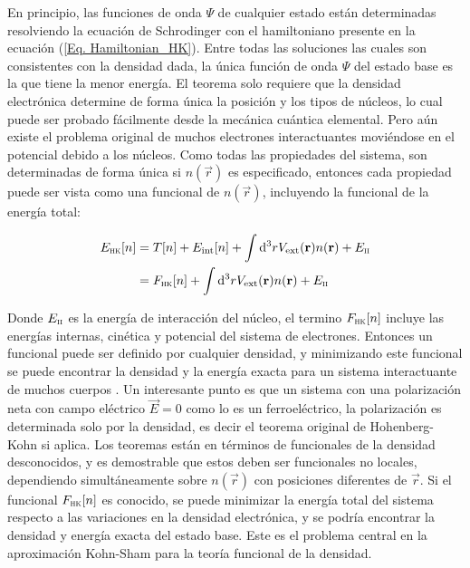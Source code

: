 
En principio, las funciones de onda $\Psi$ de cualquier estado están determinadas resolviendo la ecuación de Schrodinger con el hamiltoniano presente en la ecuación (\ref{Eq. Hamiltonian_HK}).  Entre todas las soluciones las cuales son consistentes con la densidad dada, la única función de onda $\Psi$ del estado base es la que tiene la menor energía. El teorema solo requiere que la densidad electrónica determine de forma única la posición y los tipos de núcleos, lo cual puede ser probado fácilmente desde la mecánica cuántica elemental. Pero aún existe el problema original de muchos electrones interactuantes moviéndose en el potencial debido a los núcleos. Como todas las propiedades del sistema, son determinadas de forma única si $n(\vec{r})$ es especificado, entonces cada propiedad puede ser vista como una funcional de $n(\vec{r})$, incluyendo la funcional de la energía total:

\begin{equation}
    \begin{split}
        E_{\textsc{hk}}[n]&=T[n]+E_{\text{int}}[n]+\int\mathrm{d}^{3}rV_{\text{ext}}(\vec{r})n(\vec{r})+E_{\textsc{ii}}\\
        &=F_{\textsc{hk}}[n]+\int\mathrm{d}^{3}rV_{\text{ext}}(\vec{r})n(\vec{r})+E_{\textsc{ii}}
    \end{split}
    \label{Eq. E_HK}
\end{equation}

Donde $E_{\textsc{ii}}$ es la energía de interacción del núcleo, el termino $F_{\textsc{hk}}[n]$ incluye  las energías internas, cinética y potencial del sistema de electrones. Entonces un funcional puede ser definido por cualquier densidad, y minimizando este funcional se puede encontrar la densidad y la energía exacta para un sistema interactuante de muchos cuerpos \cite{martin_2004}. Un interesante punto es que un sistema con una polarización neta con campo eléctrico $\vec{E}=0$ como lo es un ferroeléctrico, la polarización es determinada solo por la densidad\cite{Martin1997FunctionalSystems,Martin1997RecentSolids}, es decir el teorema original de Hohenberg-Kohn si aplica. Los teoremas están en términos de funcionales de la densidad desconocidos, y es demostrable que estos deben ser funcionales no locales, dependiendo simultáneamente sobre $n(\vec{r})$ con posiciones diferentes de $\vec{r}$. Si el funcional $F_{\textsc{hk}}[n]$ es conocido, se puede minimizar la energía total del sistema respecto a las variaciones en la densidad electrónica, y se podría encontrar la densidad y energía exacta del estado base. Este es el problema central en la aproximación Kohn-Sham para la teoría funcional de la densidad. 

